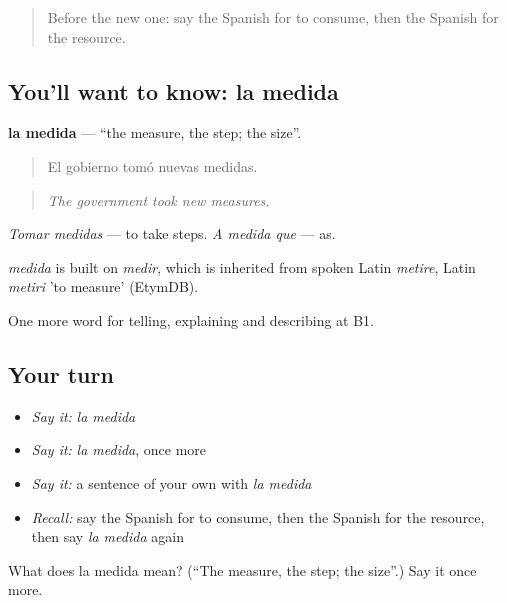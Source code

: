 \label{lesson:ES-C607-medida}



\begin{quote}
Before the new one: say the Spanish for to consume, then the Spanish for the resource.
\end{quote}

\subsection*{You'll want to know: la medida}
\textbf{la medida} — \textquotedblleft{}the measure, the step; the size\textquotedblright{}.

\begin{quote}
El gobierno tomó nuevas medidas.
\end{quote}

\begin{quote}
\emph{The government took new measures.}
\end{quote}

\emph{Tomar medidas} — to take steps. \emph{A medida que} — as.

\begin{cousinweb}
\emph{medida} is built on \emph{medir}, which is inherited from spoken Latin \emph{metire}, Latin \emph{metiri} 'to measure' (EtymDB).
\end{cousinweb}

\begin{grammarlens}[title={What you've built}]
One more word for telling, explaining and describing at B1.
\end{grammarlens}

\subsection*{Your turn}
\begin{itemize}
\raggedright
  \item \emph{Say it:} \emph{la medida}
  \item \emph{Say it:} \emph{la medida}, once more
  \item \emph{Say it:} a sentence of your own with \emph{la medida}
  \item \emph{Recall:} say the Spanish for to consume, then the Spanish for the resource, then say \emph{la medida} again
\end{itemize}

\begin{tcolorbox}[breakable,colback=teal!4,colframe=teal!35!black,title={Before you move on}]
What does la medida mean? (\textquotedblleft{}The measure, the step; the size\textquotedblright{}.) Say it once more.
\end{tcolorbox}
